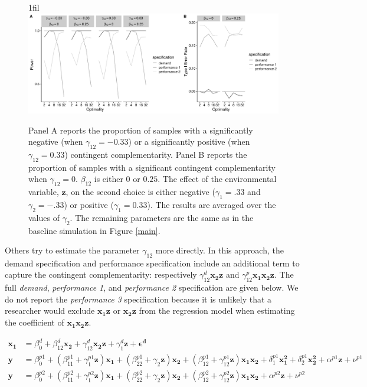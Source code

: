 \documentclass[12pt]{article}
\makeatletter
\newcommand*{\centerfloat}{%
  \parindent \z@
  \leftskip \z@ \@plus 1fil \@minus \textwidth
  \rightskip\leftskip
  \parfillskip \z@skip}
\makeatother
\begin{document}
\begin{figure}
\centerfloat
\includegraphics[width=450px]{figure-latex/contingent_complementarity.pdf}
\caption[Error Rate and Power with Contingent Complementarity]
{\label{contingent-complement} Panel A reports the proportion of samples with a significantly negative (when $\gamma_{12} = -0.33$) or a significantly positive (when $\gamma_{12} = 0.33$) contingent complementarity. Panel B reports the proportion of samples with a significant contingent complementarity when $\gamma_{12} = 0$. $\beta_{12}$ is either $0$ or $0.25$. The effect of the environmental variable, $\mathbf{z}$, on the second choice is either negative ($\gamma_1 = .33$ and $\gamma_2 = -.33$) or positive ($\gamma_1 = 0.33$). The results are averaged over the values of $\gamma_2$. The remaining parameters are the same as in the baseline simulation in Figure \ref{main}.}
\end{figure}

Others try to estimate the parameter $\gamma_{12}$ more directly. In this approach, the demand specification and performance specification include an additional term to capture the contingent complementarity: respectively $\gamma^d_{12} \mathbf{x_2 z}$ and $\gamma^p_{12} \mathbf{x_1 x_2 z}$. The full \emph{demand}, \emph{performance 1}, and \emph{performance 2} specification are given below. We do not report the \emph{performance 3} specification because it is unlikely that a researcher would exclude $\mathbf{x_1 z}$ or $\mathbf{x_2 z}$ from the regression model when estimating the coefficient of $\mathbf{x_1 x_2 z}$.


\begin{align*} 
\mathbf{x_1} &= \beta_0^d + \beta_{12}^d \mathbf{x_2} + \gamma_{12}^d \mathbf{x_2 z}
        + \gamma_{1}^d \mathbf{z}
        + \mathbf{\epsilon^d} \\
\mathbf{y} &=  \beta^{p1}_0 + (\beta^{p1}_{11} + \gamma_1^{p1} \mathbf{z} )\mathbf{x_1} 
						+ (\beta_{22}^{p1} + \gamma_2 \mathbf{z} ) \mathbf{x_2} 
                        + (\beta_{12}^{p1} + \gamma_{12}^{p1} \mathbf{z}) \mathbf{x_1} \mathbf{x_2} 
                        + \delta_1^{p1} \mathbf{x^2_1} + \delta_2^{p1} \mathbf{x^2_2} 
                        + \alpha^{p1} \mathbf{z}
                        + \nu^{p1} \\
 \mathbf{y} &=  \beta^{p2}_0 + (\beta^{p2}_{11} + \gamma_1^{p2} \mathbf{z} )\mathbf{x_1} 
						+ (\beta_{22}^{p2} + \gamma_2 \mathbf{z} ) \mathbf{x_2} 
                        + (\beta_{12}^{p2} + \gamma_{12}^{p2} \mathbf{z}) \mathbf{x_1} \mathbf{x_2} 
                        + \alpha^{p2} \mathbf{z}
                        + \nu^{p2} \\
\end{align*}
\end{document}
